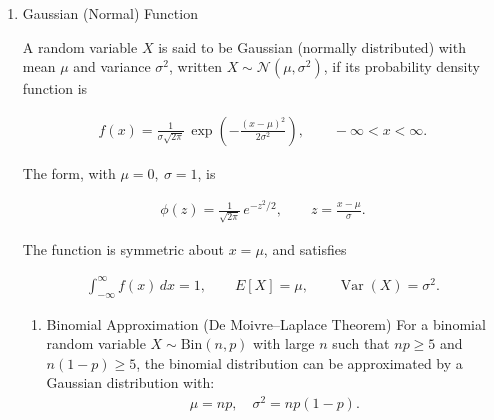 \begin{enumerate}[label=\thesubsection.\arabic*,ref=\thesubsection.\theenumi]
For a quantity that decays logarithmically with time,

\begin{align}
\sigma(t)=\sigma_0-k\ln(t),\qquad t\ge 1,
\end{align}

the difference between two times $t_1,t_2$ eliminates the unknown
constant $\sigma_0$:

\begin{align}
\sigma(t_2)-\sigma(t_1)&=-k\left[\ln(t_2)-\ln(t_1)\right]\\
&=-k\ln\!\left(\frac{t_2}{t_1}\right). \label{decay}
\end{align}


\item Gaussian (Normal) Function

A random variable $X$ is said to be Gaussian (normally distributed)
with mean $\mu$ and variance $\sigma^{2}$, written
$X\sim\mathcal{N}(\mu,\sigma^{2})$, if its probability density
function is

\begin{align} \label{gaussian}
f(x)=\frac{1}{\sigma\sqrt{2\pi}}\,
\exp\!\left(-\frac{(x-\mu)^{2}}{2\sigma^{2}}\right),
\qquad -\infty<x<\infty.
\end{align}

The  form, with $\mu=0,\ \sigma=1$, is

\begin{align}
\phi(z)=\frac{1}{\sqrt{2\pi}}\,e^{-z^{2}/2},
\qquad z=\frac{x-\mu}{\sigma}.
\end{align}

The function is symmetric about $x=\mu$, and satisfies

\begin{align}
\int_{-\infty}^{\infty}f(x)\,dx=1,
\qquad
E[X]=\mu,
\qquad
\operatorname{Var}(X)=\sigma^{2}.
\end{align}


\begin{enumerate}

    \item Binomial Approximation (De Moivre--Laplace Theorem)
    For a binomial random variable $X \sim \text{Bin}(n, p)$ with large $n$ such that $np \ge 5$ and $n(1-p) \ge 5$, the binomial distribution can be approximated by a Gaussian distribution with:
    \begin{align}
    \mu = np, \quad \sigma^2 = np(1-p).
    \end{align}
    

\end{enumerate}
\end{enumerate}
